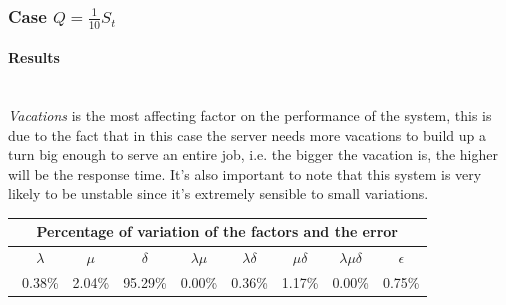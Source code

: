 \documentclass{article}
\begin{document}
        \newpage
            \subsubsection{Case $Q = \frac{1}{10} S_t$}
            
                \paragraph{Results} \hfill \\
                \textit{Vacations} is the most affecting factor on the performance of the system, this is due to the fact that in this case the server needs more vacations to build up a turn big enough to serve an entire job, i.e. the bigger the vacation is, the higher will be the response time.
                It's also important to note that this system is very likely to be unstable since it's extremely sensible to small variations.

                    \begin{table}[htbp]
                        \centering 
                        \begin{tabular}{|c|c|c|c|c|c|c|c|}
                            \hline
                            \multicolumn{8}{|c|}{\bf Percentage of variation of the factors and the error} \\
                            \hline
                            \ $\lambda$ & $\mu$ & $\delta$ & $\lambda\mu$ & $\lambda\delta$ & $\mu\delta$ & $\lambda\mu\delta$ & $\epsilon$ \\
                            \hline
                            \ 0.38\% & 2.04\% & 95.29\% & 0.00\% & 0.36\% & 1.17\% & 0.00\% & 0.75\% \\ 
                            \hline
                        \end{tabular}
                        \label{table:variation_0,1}
                    \end{table}
                    
\end{document}
